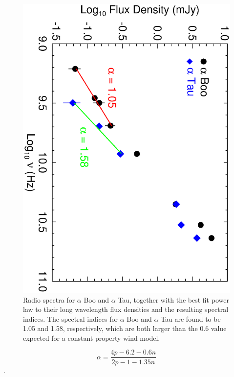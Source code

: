 \documentclass[iop]{emulateapj}
\begin{document}
\begin{figure}
\includegraphics[trim = 0mm 0mm 0mm 10mm, clip,scale=0.385,angle=90]{fig3.ps}
\caption{Radio spectra for $\alpha$ Boo and $\alpha$ Tau, together with the best fit power law to their long wavelength flux densities and the resulting spectral indices. The spectral indices for $\alpha$ Boo and $\alpha$ Tau are found to be 1.05 and 1.58, respectively, which are both larger than the 0.6 value expected for a constant property wind model.}
\label{fig:fig3}
\end{figure}

\begin{equation}
\alpha = \frac{4p -6.2 -0.6n}{2p-1-1.35n}
\label{eq:eq1}
\end{equation}
\citep[e.g.,][]{1987ApJ...312..813S}. 
\end{document}
